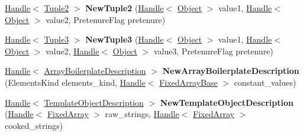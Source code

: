 \begin{DoxyCompactItemize}
\mbox{\hyperlink{classv8_1_1internal_1_1Handle}{Handle}}$<$ \mbox{\hyperlink{classv8_1_1internal_1_1Tuple2}{Tuple2}} $>$ {\bfseries New\+Tuple2} (\mbox{\hyperlink{classv8_1_1internal_1_1Handle}{Handle}}$<$ \mbox{\hyperlink{classv8_1_1internal_1_1Object}{Object}} $>$ value1, \mbox{\hyperlink{classv8_1_1internal_1_1Handle}{Handle}}$<$ \mbox{\hyperlink{classv8_1_1internal_1_1Object}{Object}} $>$ value2, Pretenure\+Flag pretenure)
\item 
\mbox{\label{classv8_1_1internal_1_1Factory_a70fe870341dcea1f0c212dc080e144f2}} 
\mbox{\hyperlink{classv8_1_1internal_1_1Handle}{Handle}}$<$ \mbox{\hyperlink{classv8_1_1internal_1_1Tuple3}{Tuple3}} $>$ {\bfseries New\+Tuple3} (\mbox{\hyperlink{classv8_1_1internal_1_1Handle}{Handle}}$<$ \mbox{\hyperlink{classv8_1_1internal_1_1Object}{Object}} $>$ value1, \mbox{\hyperlink{classv8_1_1internal_1_1Handle}{Handle}}$<$ \mbox{\hyperlink{classv8_1_1internal_1_1Object}{Object}} $>$ value2, \mbox{\hyperlink{classv8_1_1internal_1_1Handle}{Handle}}$<$ \mbox{\hyperlink{classv8_1_1internal_1_1Object}{Object}} $>$ value3, Pretenure\+Flag pretenure)
\item 
\mbox{\label{classv8_1_1internal_1_1Factory_a10a2c62c1e482d241319ae7c255d7b06}} 
\mbox{\hyperlink{classv8_1_1internal_1_1Handle}{Handle}}$<$ \mbox{\hyperlink{classv8_1_1internal_1_1ArrayBoilerplateDescription}{Array\+Boilerplate\+Description}} $>$ {\bfseries New\+Array\+Boilerplate\+Description} (Elements\+Kind elements\+\_\+kind, \mbox{\hyperlink{classv8_1_1internal_1_1Handle}{Handle}}$<$ \mbox{\hyperlink{classv8_1_1internal_1_1FixedArrayBase}{Fixed\+Array\+Base}} $>$ constant\+\_\+values)
\item 
\mbox{\label{classv8_1_1internal_1_1Factory_ae4b879918cff30a53832b26ab12982c6}} 
\mbox{\hyperlink{classv8_1_1internal_1_1Handle}{Handle}}$<$ \mbox{\hyperlink{classv8_1_1internal_1_1TemplateObjectDescription}{Template\+Object\+Description}} $>$ {\bfseries New\+Template\+Object\+Description} (\mbox{\hyperlink{classv8_1_1internal_1_1Handle}{Handle}}$<$ \mbox{\hyperlink{classv8_1_1internal_1_1FixedArray}{Fixed\+Array}} $>$ raw\+\_\+strings, \mbox{\hyperlink{classv8_1_1internal_1_1Handle}{Handle}}$<$ \mbox{\hyperlink{classv8_1_1internal_1_1FixedArray}{Fixed\+Array}} $>$ cooked\+\_\+strings)
\item 
\mbox{\label{classv8_1_1internal_1_1Factory_ab8fb47e2c2e5b9c9a1b7a85a563de604}} 

\end{DoxyCompactItemize}
